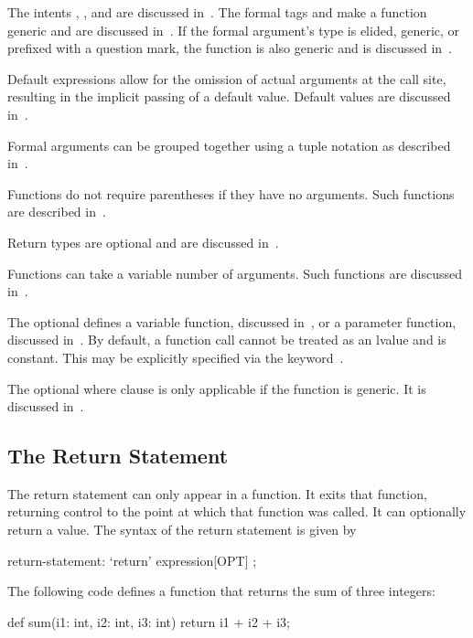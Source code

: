 The intents , , and  are discussed
in~.  The formal tags  and  make
a function generic and are discussed in~.  If the
formal argument's type is elided, generic, or prefixed with a question
mark, the function is also generic and is discussed
in~.

Default expressions allow for the omission of actual arguments at the
call site, resulting in the implicit passing of a default value.
Default values are discussed in~.

Formal arguments can be grouped together using a tuple notation as
described in~.

Functions do not require parentheses if they have no arguments.  Such
functions are described in~.

Return types are optional and are discussed in~.

Functions can take a variable number of arguments.  Such functions are
discussed in~.

The optional  defines a variable function,
discussed in~, or a parameter function,
discussed in~.  By default, a function call
cannot be treated as an lvalue and is constant.  This may be
explicitly specified via the keyword~.

The optional where clause is only applicable if the function is
generic.  It is discussed in~.

\subsection{The Return Statement}
\label{The_Return_Statement}

The return statement can only appear in a function.  It exits that
function, returning control to the point at which that function was
called.  It can optionally return a value.  The syntax of the return
statement is given by
\begin{syntax}
return-statement:
  `return' expression[OPT] ;
\end{syntax}

\begin{example}
The following code defines a function that returns the sum of three
integers:
\begin{chapel}
def sum(i1: int, i2: int, i3: int)
  return i1 + i2 + i3;
\end{chapel}
\end{example}

